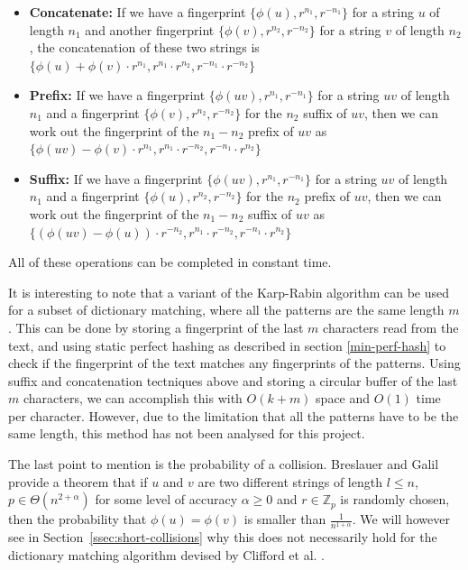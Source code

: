 \documentclass[ %
                    author={Dominic Joseph Moylett},
                    degree={MEng},
                     title={Dictionary Matching with Fingerprints},
                  subtitle={An Empirical Analysis},
                      type={research},
                      year={2015} ]{dissertation}
\begin{document}
\begin{itemize}
  \item \textbf{Concatenate:} If we have a fingerprint $\{\phi(u), r^{n_1}, r^{-n_1}\}$ for a string $u$ of length $n_1$ and another fingerprint $\{\phi(v), r^{n_2}, r^{-n_2}\}$ for a string $v$ of length $n_2$, the concatenation of these two strings is $\{\phi(u) + \phi(v)\cdot r^{n_1}, r^{n_1} \cdot r^{n_2}, r^{-n_1} \cdot r^{-n_2}\}$
  \item \textbf{Prefix:} If we have a fingerprint $\{\phi(uv), r^{n_1}, r^{-n_1}\}$ for a string $uv$ of length $n_1$ and a fingerprint $\{\phi(v), r^{n_2}, r^{-n_2}\}$ for the $n_2$ suffix of $uv$, then we can work out the fingerprint of the $n_1 - n_2$ prefix of $uv$ as $\{\phi(uv) - \phi(v)\cdot r^{n_1}, r^{n_1} \cdot r^{-n_2}, r^{-n_1} \cdot r^{n_2}\}$
  \item \textbf{Suffix:} If we have a fingerprint $\{\phi(uv), r^{n_1}, r^{-n_1}\}$ for a string $uv$ of length $n_1$ and a fingerprint $\{\phi(u), r^{n_2}, r^{-n_2}\}$ for the $n_2$ prefix of $uv$, then we can work out the fingerprint of the $n_1 - n_2$ suffix of $uv$ as $\{(\phi(uv) - \phi(u))\cdot r^{-n_2}, r^{n_1} \cdot r^{-n_2}, r^{-n_1} \cdot r^{n_2}\}$
\end{itemize}

All of these operations can be completed in constant time.

It is interesting to note that a variant of the Karp-Rabin algorithm can be used for a subset of dictionary matching, where all the patterns are the same length $m$\cite{candan:data}. This can be done by storing a fingerprint of the last $m$ characters read from the text, and using static perfect hashing as described in section \ref{min-perf-hash} to check if the fingerprint of the text matches any fingerprints of the patterns. Using suffix and concatenation tectniques above and storing a circular buffer of the last $m$ characters, we can accomplish this with $O(k + m)$ space and $O(1)$ time per character. However, due to the limitation that all the patterns have to be the same length, this method has not been analysed for this project.

The last point to mention is the probability of a collision. Breslauer and Galil\cite{Breslauer:2014:RSS:2660854.2635814} provide a theorem that if $u$ and $v$ are two different strings of length $l \leq n$, $p \in \Theta(n^{2 + \alpha})$ for some level of accuracy $\alpha \geq 0$ and $r \in \mathbb{Z}_p$ is randomly chosen, then the probability that $\phi(u) = \phi(v)$ is smaller than $\frac{1}{n^{1 + \alpha}}$. We will however see in Section~\ref{ssec:short-collisions} why this does not necessarily hold for the dictionary matching algorithm devised by Clifford et al. \cite{2015arXiv150406242C}.
\end{document}
